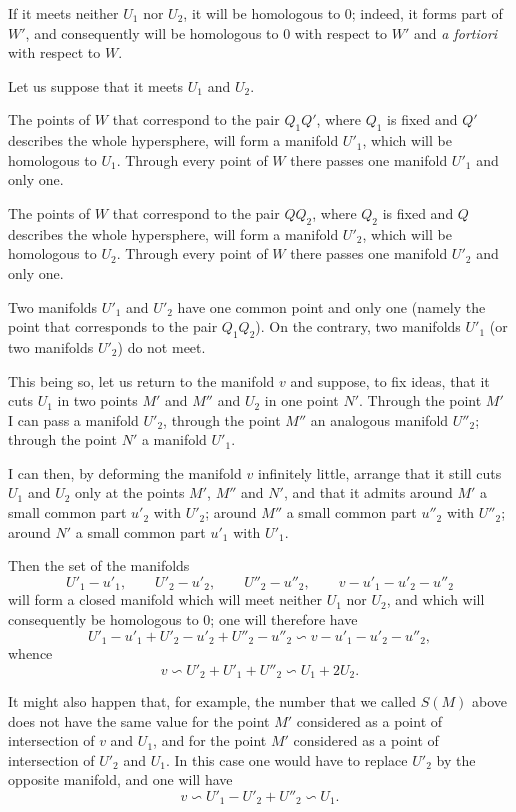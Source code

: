 \documentclass{article}
\begin{document}
If it meets neither $U_{1}$ nor $U_{2}$, it will be homologous to 0; indeed, it forms part of $W'$, and consequently will be homologous to 0 with respect to $W'$ and \emph{a fortiori} with respect to $W$.

Let us suppose that it meets $U_{1}$ and $U_{2}$.

The points of $W$ that correspond to the pair $Q_{1}Q'$, where $Q_{1}$ is fixed and $Q'$ describes the whole hypersphere, will form a manifold $U'_{1}$, which will be homologous to $U_{1}$. Through every point of $W$ there passes one manifold $U'_{1}$ and only one.

The points of $W$ that correspond to the pair $QQ_{2}$, where $Q_{2}$ is fixed and $Q$ describes the whole hypersphere, will form a manifold $U'_{2}$, which will be homologous to $U_{2}$. Through every point of $W$ there passes one manifold $U'_{2}$ and only one.

Two manifolds $U'_{1}$ and $U'_{2}$ have one common point and only one (namely the point that corresponds to the pair $Q_{1}Q_{2}$). On the contrary, two manifolds $U'_{1}$ (or two manifolds $U'_{2}$) do not meet.

This being so, let us return to the manifold $v$ and suppose, to fix ideas, that it cuts $U_{1}$ in two points $M'$ and $M''$ and $U_{2}$ in one point $N'$. Through the point $M'$ I can pass a manifold $U'_{2}$, through the point $M''$ an analogous manifold $U''_{2}$; through the point $N'$ a manifold $U'_{1}$.

I can then, by deforming the manifold $v$ infinitely little, arrange that it still cuts $U_{1}$ and $U_{2}$ only at the points $M'$, $M''$ and $N'$, and that it admits around $M'$ a small common part $u'_{2}$ with $U'_{2}$; around $M''$ a small common part $u''_{2}$ with $U''_{2}$; around $N'$ a small common part $u'_{1}$ with $U'_{1}$.

Then the set of the manifolds
\[ U'_{1} - u'_{1}, \qquad U'_{2} - u'_{2}, \qquad U''_{2} - u''_{2}, \qquad v - u'_{1} - u'_{2} - u''_{2} \]
will form a closed manifold which will meet neither $U_{1}$ nor $U_{2}$, and which will consequently be homologous to 0; one will therefore have
\[ U'_{1} - u'_{1} + U'_{2} - u'_{2} + U''_{2} - u''_{2} \backsim v - u'_{1} - u'_{2} - u''_{2}, \]
whence
\[ v \backsim U'_{2} + U'_{1} + U''_{2} \backsim U_{1} + 2U_{2}. \]

It might also happen that, for example, the number that we called $S(M)$ above does not have the same value for the point $M'$ considered as a point of intersection of $v$ and $U_{1}$, and for the point $M'$ considered as a point of intersection of $U'_{2}$ and $U_{1}$. In this case one would have to replace $U'_{2}$ by the opposite manifold, and one will have
\[ v \backsim U'_{1} - U'_{2} + U''_{2} \backsim U_{1}. \]
\end{document}
